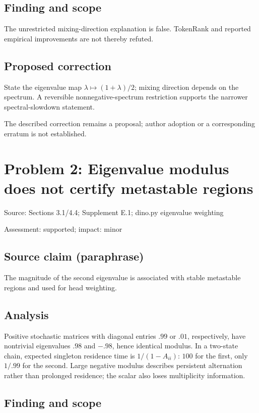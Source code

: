 \documentclass[11pt]{article}
\begin{document}
\subsection*{Finding and scope}

The unrestricted mixing-direction explanation is false. TokenRank and reported empirical improvements are not thereby refuted.

\subsection*{Proposed correction}

State the eigenvalue map \(\lambda\mapsto(1+\lambda)/2\); mixing direction depends on the spectrum. A reversible nonnegative-spectrum restriction supports the narrower spectral-slowdown statement.

The described correction remains a proposal; author adoption or a corresponding erratum is not established.

\section*{Problem 2: Eigenvalue modulus does not certify metastable regions}

Source: Sections 3.1/4.4; Supplement E.1; dino.py eigenvalue weighting

Assessment: supported; impact: minor

\subsection*{Source claim (paraphrase)}

The magnitude of the second eigenvalue is associated with stable metastable regions and used for head weighting.

\subsection*{Analysis}

Positive stochastic matrices with diagonal entries \(.99\) or \(.01\), respectively, have nontrivial eigenvalues \(.98\) and \(-.98\), hence identical modulus. In a two-state chain, expected singleton residence time is \(1/(1-A_{ii})\): \(100\) for the first, only \(1/.99\) for the second. Large negative modulus describes persistent alternation rather than prolonged residence; the scalar also loses multiplicity information.

\subsection*{Finding and scope}
\end{document}
